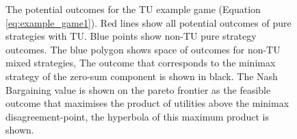 \begin{figure}[tb]
\begin{tikzpicture}[line cap=round,line join=round,>=triangle 45,x=1cm,y=1cm]
\end{tikzpicture}
\caption[Utility diagram for example game.]{The potential outcomes for the TU example game (Equation \ref{eq:example_game1}). Red lines show all potential outcomes of pure strategies with TU. Blue points show non-TU pure strategy outcomes. The blue polygon shows space of outcomes for non-TU mixed strategies, The outcome that corresponds to the minimax strategy of the zero-sum component is shown in black. The Nash Bargaining value is shown on the pareto frontier as the feasible outcome that maximises the product of utilities above the minimax disagreement-point, the hyperbola of this maximum product is shown.}
\label{fig:graph1_utilities}
\end{figure}
